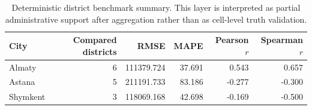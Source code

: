 \begin{table}[H]
\centering
\caption{Deterministic district benchmark summary. This layer is interpreted as partial administrative support after aggregation rather than as cell-level truth validation.}
\label{tab:district-benchmark-unified}
\begin{tabular}{lrrrrr}
\toprule
City & Compared districts & RMSE & MAPE & Pearson $r$ & Spearman $r$ \\
\midrule
Almaty & 6 & 111379.724 & 37.691 & 0.543 & 0.657 \\
Astana & 5 & 211191.733 & 83.186 & -0.277 & -0.300 \\
Shymkent & 3 & 118069.168 & 42.698 & -0.169 & -0.500 \\
\bottomrule
\end{tabular}
\end{table}

